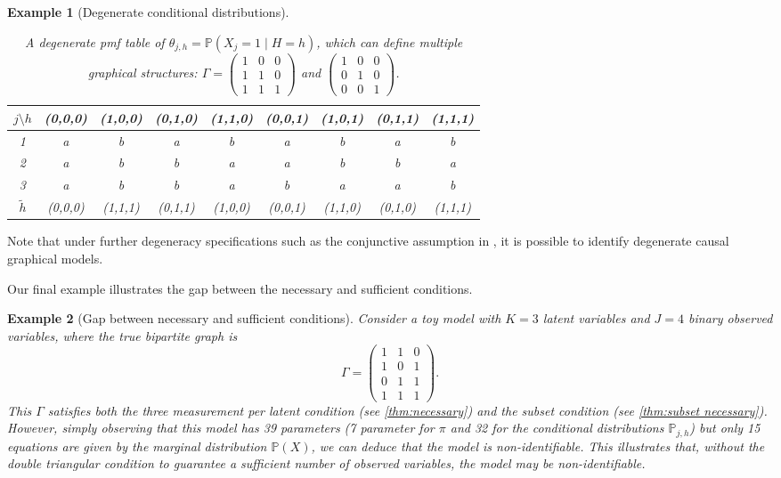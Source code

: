\documentclass[10pt]{article} %
\newtheorem{example}{Example}
\newcommand{\PP}{\mathbb P}
\def\tilde{\widetilde}
\begin{document}
\begin{example}[Degenerate conditional distributions]
\begin{table}[h!]
    \centering
    \begin{tabular}{ccccccccc}
        \toprule
        $j \setminus h$ & (0,0,0) & (1,0,0) & (0,1,0) & (1,1,0) & (0,0,1) & (1,0,1) & (0,1,1) & (1,1,1) \\
        \midrule
        1 & a & b & a & b & a & b & a & b \\
        2 & a & b & b & a & a & b & b & a \\
        3 & a & b & b & a & b & a & a & b \\
        \midrule
        $\tilde{h}$ & (0,0,0) & (1,1,1) & (0,1,1) & (1,0,0) & (0,0,1) & (1,1,0) & (0,1,0) & (1,1,1) \\
        \bottomrule
    \end{tabular}
    \vspace{2mm}
    \caption{A degenerate pmf table of $\theta_{j,h} = \PP(X_j = 1 \mid H = h)$, which can define multiple graphical structures: $\Gamma = \begin{pmatrix}
        1 & 0 & 0 \\
        1 & 1 & 0 \\
        1 & 1 & 1
    \end{pmatrix}$ and $ \begin{pmatrix}
        1 & 0 & 0 \\
        0 & 1 & 0 \\
        0 & 0 & 1
    \end{pmatrix}$.}
    \label{tab:degenerate}
\end{table}
\end{example}

Note that under further degeneracy specifications such as the conjunctive assumption in \cite{lee2024latent}, it is possible to identify degenerate causal graphical models.




Our final example illustrates the gap between the necessary and sufficient conditions.
\begin{example}[Gap between necessary and sufficient conditions]\label{ex:condition gap}
    Consider a toy model with $K = 3$ latent variables and $J = 4$ binary observed variables, where the true bipartite graph is
    $$\Gamma = \begin{pmatrix}
        1 & 1 & 0 \\ 1 & 0 & 1 \\ 0 & 1 & 1 \\ 1 & 1 & 1
    \end{pmatrix}.$$ 
    This $\Gamma$ satisfies both the three measurement per latent condition (see \cref{thm:necessary}) and the subset condition (see \cref{thm:subset necessary}). However, simply observing that this model has 39 parameters (7 parameter for $\pi$ and 32 for the conditional distributions $\PP_{j,h}$) but only 15 equations are given by the marginal distribution $\PP(X)$, we can deduce that the model is non-identifiable. This illustrates that, without the double triangular condition to guarantee a sufficient number of observed variables, the model may be non-identifiable.
\end{example}
\end{document}
